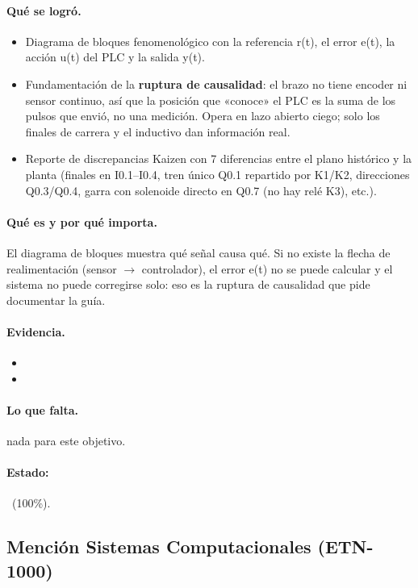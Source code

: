 \documentclass[a4paper,11pt]{article}
\begin{document}
\paragraph{Qué se logró.}
\begin{itemize}
\item Diagrama de bloques fenomenológico con la referencia r(t), el error e(t), la acción u(t) del PLC y la salida y(t).
\item Fundamentación de la \textbf{ruptura de causalidad}: el brazo no tiene encoder ni sensor continuo, así que la posición que «conoce» el PLC es la suma de los pulsos que envió, no una medición. Opera en lazo abierto ciego; solo los finales de carrera y el inductivo dan información real.
\item Reporte de discrepancias Kaizen con 7 diferencias entre el plano histórico y la planta (finales en I0.1–I0.4, tren único Q0.1 repartido por K1/K2, direcciones Q0.3/Q0.4, garra con solenoide directo en Q0.7 (no hay relé K3), etc.).
\end{itemize}
\paragraph{Qué es y por qué importa.} El diagrama de bloques muestra qué señal causa qué. Si no existe la flecha de realimentación (sensor $\to$ controlador), el error e(t) no se puede calcular y el sistema no puede corregirse solo: eso es la ruptura de causalidad que pide documentar la guía.
\paragraph{Evidencia.}
\begin{itemize}\small
\item {}
\item {}
\end{itemize}
\paragraph{Lo que falta.} nada para este objetivo.
\paragraph{Estado:} \cumple~(100\%).
\subsection{Mención Sistemas Computacionales (ETN-1000)}
\end{document}
